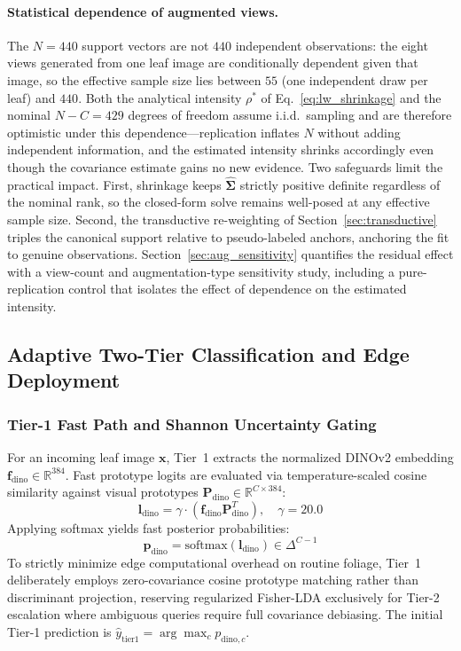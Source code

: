 \documentclass[preprint,12pt]{elsarticle}
\begin{document}
\paragraph{Statistical dependence of augmented views.}
The $N=440$ support vectors are not $440$ independent observations: the eight views generated from one leaf image are conditionally dependent given that image, so the effective sample size lies between $55$ (one independent draw per leaf) and $440$. Both the analytical intensity $\rho^*$ of Eq.~\eqref{eq:lw_shrinkage} and the nominal $N-C=429$ degrees of freedom assume i.i.d.\ sampling and are therefore optimistic under this dependence---replication inflates $N$ without adding independent information, and the estimated intensity shrinks accordingly even though the covariance estimate gains no new evidence. Two safeguards limit the practical impact. First, shrinkage keeps $\hat{\mathbf{\Sigma}}$ strictly positive definite regardless of the nominal rank, so the closed-form solve remains well-posed at any effective sample size. Second, the transductive re-weighting of Section~\ref{sec:transductive} triples the canonical support relative to pseudo-labeled anchors, anchoring the fit to genuine observations. Section~\ref{sec:aug_sensitivity} quantifies the residual effect with a view-count and augmentation-type sensitivity study, including a pure-replication control that isolates the effect of dependence on the estimated intensity.

\subsection{Adaptive Two-Tier Classification and Edge Deployment}
\label{sec:edge_cascade}

\subsubsection{Tier-1 Fast Path and Shannon Uncertainty Gating}
For an incoming leaf image $\mathbf{x}$, Tier~1 extracts the normalized DINOv2 embedding $\mathbf{f}_{\text{dino}} \in \mathbb{R}^{384}$. Fast prototype logits are evaluated via temperature-scaled cosine similarity against visual prototypes $\mathbf{P}_{\text{dino}} \in \mathbb{R}^{C \times 384}$:
\begin{equation}
    \label{eq:tier1_logits}
    \mathbf{l}_{\text{dino}} = \gamma \cdot \left(\mathbf{f}_{\text{dino}} \mathbf{P}_{\text{dino}}^T\right), \quad \gamma = 20.0
\end{equation}
Applying softmax yields fast posterior probabilities:
\begin{equation}
    \label{eq:tier1_softmax}
    \mathbf{p}_{\text{dino}} = \text{softmax}(\mathbf{l}_{\text{dino}}) \in \Delta^{C-1}
\end{equation}
To strictly minimize edge computational overhead on routine foliage, Tier~1 deliberately employs zero-covariance cosine prototype matching rather than discriminant projection, reserving regularized Fisher-LDA exclusively for Tier-2 escalation where ambiguous queries require full covariance debiasing. The initial Tier-1 prediction is $\hat{y}_{\text{tier1}} = \arg\max_c p_{\text{dino}, c}$.
\end{document}
